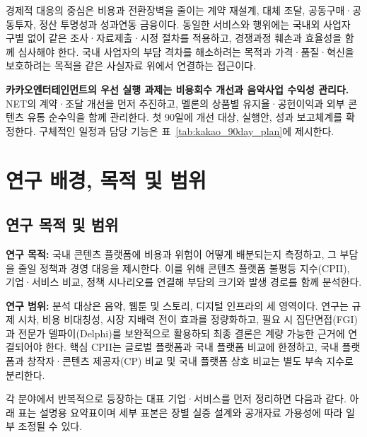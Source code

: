\documentclass[11pt,a4paper]{report}
\begin{document}
경제적 대응의 중심은 비용과 전환장벽을 줄이는 계약 재설계, 대체 조달, 공동구매·공동투자, 정산 투명성과 성과연동 금융이다. 동일한 서비스와 행위에는 국내외 사업자 구별 없이 같은 조사·자료제출·시정 절차를 적용하고, 경쟁과정 훼손과 효율성을 함께 심사해야 한다. 국내 사업자의 부담 격차를 해소하려는 목적과 가격·품질·혁신을 보호하려는 목적을 같은 사실자료 위에서 연결하는 접근이다.

\begin{ReportCallout}
\textbf{카카오엔터테인먼트의 우선 실행 과제는 비용회수 개선과 음악사업 수익성 관리다.} NET의 계약·조달 개선을 먼저 추진하고, 멜론의 상품별 유지율·공헌이익과 외부 콘텐츠 유통 순수익을 함께 관리한다. 첫 90일에 개선 대상, 실행안, 성과 보고체계를 확정한다. 구체적인 일정과 담당 기능은 표~\ref{tab:kakao_90day_plan}에 제시한다.
\end{ReportCallout}

\clearpage

\tableofcontents
\clearpage

\chapter{연구 배경, 목적 및 범위}
\section{연구 목적 및 범위}
\textbf{연구 목적:} 국내 콘텐츠 플랫폼에 비용과 위험이 어떻게 배분되는지 측정하고, 그 부담을 줄일 정책과 경영 대응을 제시한다. 이를 위해 콘텐츠 플랫폼 불평등 지수(CPII), 기업·서비스 비교, 정책 시나리오를 연결해 부담의 크기와 발생 경로를 함께 분석한다.

\textbf{연구 범위:} 분석 대상은 음악, 웹툰 및 스토리, 디지털 인프라의 세 영역이다. 연구는 규제 시차, 비용 비대칭성, 시장 지배력 전이 효과를 정량화하고, 필요 시 집단면접(FGI)과 전문가 델파이(Delphi)를 보완적으로 활용하되 최종 결론은 계량 가능한 근거에 연결되어야 한다. 핵심 CPII는 글로벌 플랫폼과 국내 플랫폼 비교에 한정하고, 국내 플랫폼과 창작자·콘텐츠 제공자(CP) 비교 및 국내 플랫폼 상호 비교는 별도 부속 지수로 분리한다.

각 분야에서 반복적으로 등장하는 대표 기업·서비스를 먼저 정리하면 다음과 같다. 아래 표는 설명용 요약표이며 세부 표본은 장별 실증 설계와 공개자료 가용성에 따라 일부 조정될 수 있다.
\end{document}
